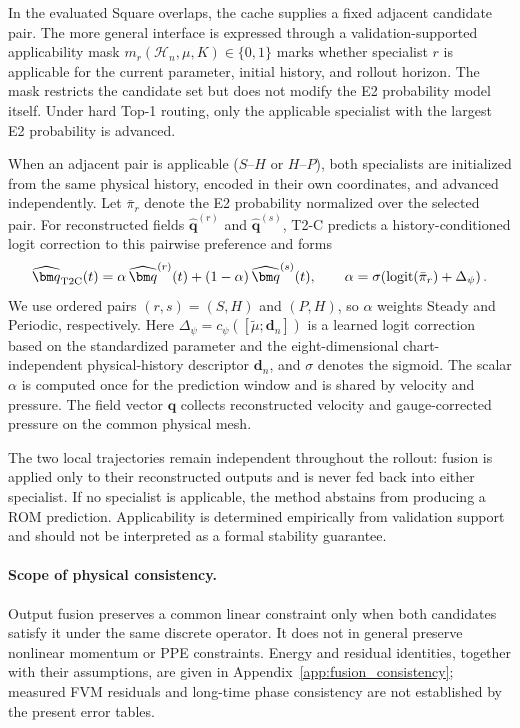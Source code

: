 In the evaluated Square overlaps, the cache supplies a fixed adjacent candidate pair. The more general interface is expressed through a validation-supported applicability mask $m_r(\mathcal H_n,\mu,K)\in\{0,1\}$ marks whether specialist $r$ is applicable for the current parameter, initial history, and rollout horizon. The mask restricts the candidate set but does not modify the E2 probability
model itself. Under hard Top-1 routing, only the applicable specialist with the largest E2 probability is advanced.

When an adjacent pair is applicable ($S$--$H$ or $H$--$P$), both specialists are initialized from the same physical history, encoded in
their own coordinates, and advanced independently. Let $\bar\pi_r$ denote the E2 probability normalized over the selected pair. For reconstructed fields $\widehat{\bm q}^{(r)}$ and $\widehat{\bm q}^{(s)}$, T2-C predicts a history-conditioned logit correction to this pairwise preference and forms
\begin{equation}
  \widehat{\bm q}_{\rm T2C}(t)
  =\alpha\,\widehat{\bm q}^{(r)}(t)
  +(1-\alpha)\,\widehat{\bm q}^{(s)}(t),
  \qquad
  \alpha=
  \sigma\!\left(
  \operatorname{logit}(\bar\pi_r)+\Delta_\psi
  \right).
  \label{eq:main_t2c}
\end{equation}
We use ordered pairs $(r,s)=(S,H)$ and $(P,H)$, so $\alpha$ weights Steady and Periodic, respectively. Here $\Delta_\psi=c_\psi([\widetilde\mu;\bm d_n])$ is a learned logit correction based on the standardized parameter and the eight-dimensional chart-independent physical-history descriptor $\bm d_n$, and $\sigma$ denotes the sigmoid. The scalar $\alpha$ is computed once for the prediction window and is shared by velocity and pressure. The field vector $\bm q$ collects reconstructed velocity and gauge-corrected pressure on the common physical mesh.

The two local trajectories remain independent throughout the rollout: fusion is applied only to their reconstructed outputs and is never fed back into either specialist. If no specialist is applicable, the method abstains from producing a ROM prediction. Applicability is determined empirically from validation support and should not be interpreted as a formal stability guarantee.


\paragraph{Scope of physical consistency.}
Output fusion preserves a common linear constraint only when both
candidates satisfy it under the same discrete operator. It does not in
general preserve nonlinear momentum or PPE constraints. Energy and
residual identities, together with their assumptions, are given in
Appendix~\ref{app:fusion_consistency}; measured FVM residuals and long-time
phase consistency are not established by the present error tables.
